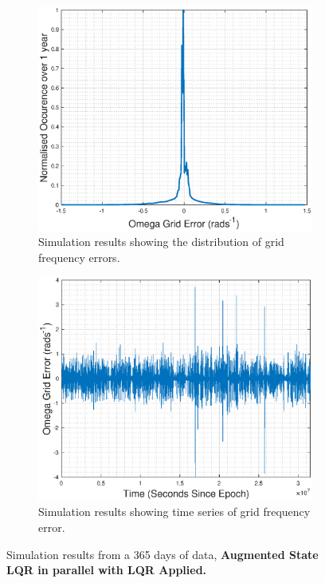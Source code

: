 \begin{figure}[ht]
\centering
\begin{subfigure}{.5\textwidth}
  \centering
  \includegraphics[width=1\linewidth]{images/results/omegafreq.eps}
  \caption{Simulation results showing the distribution of grid frequency errors.}
  \label{fig:omegaspread}
\end{subfigure}%
\begin{subfigure}{.5\textwidth}
  \centering
  \includegraphics[width=1\linewidth]{images/results/omegayear.eps}
  \caption{Simulation results showing time series of grid frequency error.}
  \label{fig:omegayearseries}
\end{subfigure}
\caption{Simulation results from a 365 days of data, {\bf Augmented State LQR in parallel with LQR Applied.}}
\label{fig:omegastuff}
\end{figure}




